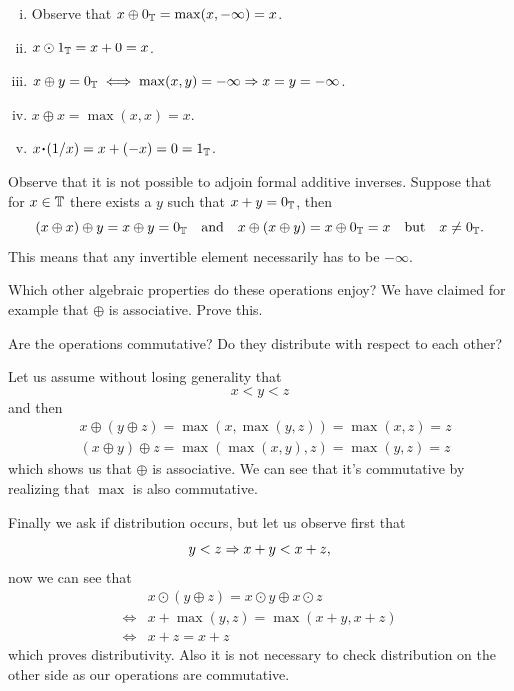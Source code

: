 \documentclass[12pt]{memoir}
\begin{document}
\begin{ptcbp}
    \begin{enumerate}[i)]
        \itemsep=-0.4em
    \item Observe that $x\oplus0_{\mathbb{T}}=\max(x,-\infty)=x$.
    \item $x\odot 1_{\mathbb{T}}=x+0=x$.
    \item $x\oplus y=0_{\mathbb{T}}\iff \max(x,y)=-\infty\Rightarrow x=y=-\infty$.
    \item $x\oplus x=\max(x,x)=x$.
    \item $x\.(1/x)=x+(-x)=0=1_\bT$.
\end{enumerate}
\end{ptcbp}
Observe that it is not possible to adjoin formal additive inverses. Suppose that for $x\in\mathbb{T}$ there exists a $y$ such that $x+y=0_{\mathbb{T}}$, then 
$$(x\oplus x)\oplus y=x\oplus y=0_{\mathbb{T}}\quad\text{and}\quad x\oplus (x\oplus y)=x\oplus 0_{\mathbb{T}}=x\quad\text{but}\quad x\neq 0_{\mathbb{T}}.$$
This means that any invertible element necessarily has to be $-\infty$.

\begin{Ej}[2-]
Which other algebraic properties do these operations enjoy? We have claimed for example that $\oplus$ is associative. Prove this.\par 
Are the operations commutative? Do they distribute with respect to each other?
\end{Ej}

\begin{ptcb}
Let us assume without losing generality that 
$$x<y<z$$
and then 
\begin{align*}
    &x\oplus (y\oplus z)=\max(x,\max(y,z))=\max(x,z)=z\\
    &(x\oplus y)\oplus z=\max(\max(x,y),z)=\max(y,z)=z
\end{align*}
which shows us that $\oplus$ is associative. We can see that it's commutative by realizing that $\max$ is also commutative.\par 
Finally we ask if distribution occurs, but let us observe first that 
$$y<z\Rightarrow x+y<x+z,$$
now we can see that 
\begin{align*}
&x\odot(y\oplus z)=x\odot y\oplus x\odot z\\
\iff &x+\max(y,z)=\max(x+y,x+z)\\
\iff &x+z=x+z
\end{align*}
which proves distributivity. Also it is not necessary to check distribution on the other side as our operations are commutative.
\end{ptcb}
\end{document}
